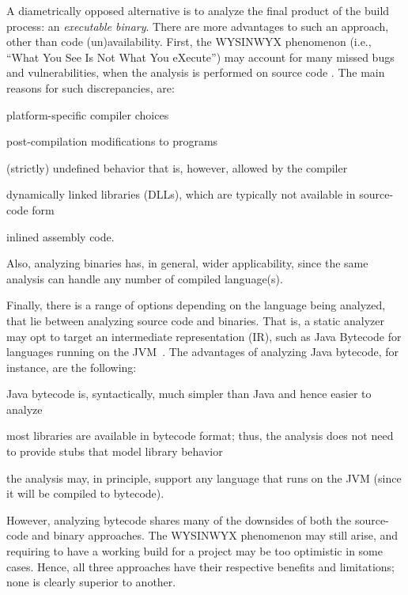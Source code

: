A diametrically opposed alternative is to analyze the final product of
the build process: an \emph{executable binary}. There are more
advantages to such an approach, other than code
(un)availability. First, the WYSINWYX phenomenon (i.e., ``What You See
Is Not What You eXecute'') may account for many missed bugs and
vulnerabilities, when the analysis is performed on source code
\cite{toplas/BalakrishnanR10}. The main reasons for such
discrepancies, are:
\begin{compactitem}[\(\cdot\)]
\item platform-specific compiler choices
\item post-compilation modifications to programs
\item (strictly) undefined behavior that is, however, allowed by the
  compiler
\item dynamically linked libraries (DLLs), which are typically not
  available in source-code form
\item inlined assembly code.
\end{compactitem}
Also, analyzing binaries has, in general, wider applicability, since
the same analysis can handle any number of compiled language(s).

Finally, there is a range of options depending on the language being
analyzed, that lie between analyzing source code and binaries. That
is, a static analyzer may opt to target an intermediate representation
(IR), such as Java Bytecode for languages running on the
JVM~\cite{Lindholm:1999:JVM:553607}. The advantages of analyzing Java
bytecode, for instance, are the following:
\begin{compactitem}[\(\cdot\)]
\item Java bytecode is, syntactically, much simpler than Java and
  hence easier to analyze
\item most libraries are available in bytecode format; thus, the
  analysis does not need to provide stubs that model library behavior
\item the analysis may, in principle, support any language that runs
  on the JVM (since it will be compiled to bytecode).
\end{compactitem}
However, analyzing bytecode shares many of the downsides of both the source-code and
binary approaches. The WYSINWYX phenomenon may still arise, and
requiring to have a working build for a project may be too optimistic
in some cases. Hence, all three approaches have their respective
benefits and limitations; none is clearly superior to another.


